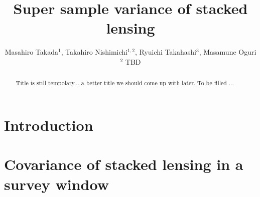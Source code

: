 \documentclass[onecolumn,notitlepage,showpacs,amsmath,amssymb,prd,floatfix]{revtex4-1}
\newcommand{\btheta}{{\bm{\theta}}}
\newcommand{\dr}{\mathrm{d}}
\begin{document}
\title{Super sample variance of stacked lensing}

\author{Masahiro Takada$^1$, Takahiro Nishimichi$^{1,2}$, Ryuichi
Takahashi$^{3}$, Masamune Oguri$^2$ TBD}
%

 \begin{abstract}
  Title is still tempolary... a better title we should come up with
  later. 
To be filled ... 
 \end{abstract}
\maketitle

\section{Introduction}

\cite{HuKravtsov:03}
\cite{TakadaBridle:07}
\cite{TakadaJain:09}
\cite{TakadaHu:13} \cite{Lietal:14a} \cite{Lietal:14b}
\cite{OguriTakada:11}
\cite{Hikageetal:13} \cite{Hikageetal:12}
\cite{TakadaSpergel:13} \cite{Schaanetal:14} \cite{Miyatakeetal:15a}
\cite{Miyatakeetal:15}
\cite{Satoetal:09} \cite{Okabeetal:10}
\cite{Lietal:15} \cite{Baldaufetal:15}


\section{Covariance of stacked lensing in a survey window}

%
\end{document}

